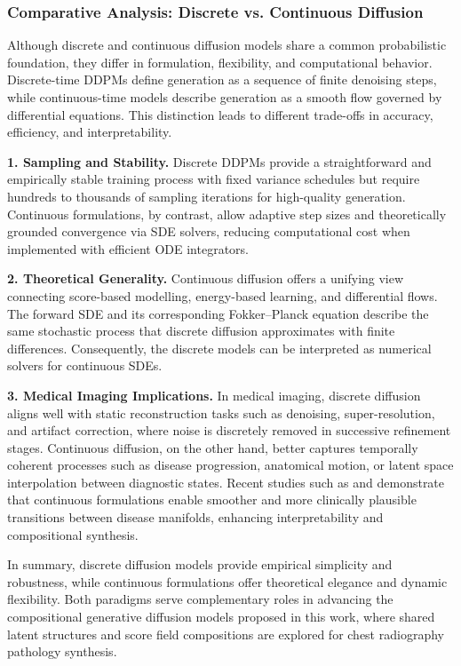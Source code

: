 \subsubsection{Comparative Analysis: Discrete vs. Continuous Diffusion}

Although discrete and continuous diffusion models share a common probabilistic foundation, they differ in formulation, flexibility, and computational behavior. Discrete-time DDPMs define generation as a sequence of finite denoising steps, while continuous-time models describe generation as a smooth flow governed by differential equations. This distinction leads to different trade-offs in accuracy, efficiency, and interpretability.

\vspace{1em}

\textbf{1. Sampling and Stability.}  
Discrete DDPMs provide a straightforward and empirically stable training process with fixed variance schedules but require hundreds to thousands of sampling iterations for high-quality generation. Continuous formulations, by contrast, allow adaptive step sizes and theoretically grounded convergence via SDE solvers, reducing computational cost when implemented with efficient ODE integrators.

\vspace{0.5em}

\textbf{2. Theoretical Generality.}  
Continuous diffusion offers a unifying view connecting score-based modelling, energy-based learning, and differential flows. The forward SDE and its corresponding Fokker–Planck equation describe the same stochastic process that discrete diffusion approximates with finite differences. Consequently, the discrete models can be interpreted as numerical solvers for continuous SDEs.

\vspace{0.5em}

\textbf{3. Medical Imaging Implications.}  
In medical imaging, discrete diffusion aligns well with static reconstruction tasks such as denoising, super-resolution, and artifact correction, where noise is discretely removed in successive refinement stages. Continuous diffusion, on the other hand, better captures temporally coherent processes such as disease progression, anatomical motion, or latent space interpolation between diagnostic states. Recent studies such as \cite{dorj2023ddpm_ct} and \cite{wolleb2022sddpm} demonstrate that continuous formulations enable smoother and more clinically plausible transitions between disease manifolds, enhancing interpretability and compositional synthesis.

\vspace{1em}

In summary, discrete diffusion models provide empirical simplicity and robustness, while continuous formulations offer theoretical elegance and dynamic flexibility. Both paradigms serve complementary roles in advancing the compositional generative diffusion models proposed in this work, where shared latent structures and score field compositions are explored for chest radiography pathology synthesis.
